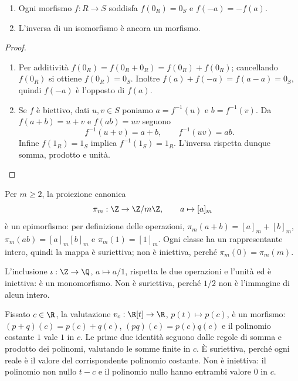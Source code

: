 \begin{proposizione}\label{prop:morfismi-zero}
\begin{enumerate}[label=\arabic*.]
\item Ogni morfismo $f:R\to S$ soddisfa $f(0_R)=0_S$ e $f(-a)=-f(a)$.
\item L'inversa di un isomorfismo è ancora un morfismo.
\end{enumerate}
\end{proposizione}
\begin{proof}
\begin{enumerate}[label=\arabic*.]
\item Per additività $f(0_R)=f(0_R+0_R)=f(0_R)+f(0_R)$; cancellando $f(0_R)$ si ottiene $f(0_R)=0_S$. Inoltre $f(a)+f(-a)=f(a-a)=0_S$, quindi $f(-a)$ è l'opposto di $f(a)$.
\item Se $f$ è biettivo, dati $u,v\in S$ poniamo $a=f^{-1}(u)$ e $b=f^{-1}(v)$. Da $f(a+b)=u+v$ e $f(ab)=uv$ seguono
\[
f^{-1}(u+v)=a+b,\qquad f^{-1}(uv)=ab.
\]
Infine $f(1_R)=1_S$ implica $f^{-1}(1_S)=1_R$. L'inversa rispetta dunque somma, prodotto e unità.
\end{enumerate}
\end{proof}

\begin{esempio}
Per $m\ge2$, la proiezione canonica
\[
\pi_m:\Z\to\Z/m\Z,\qquad a\mapsto[a]_m
\]
è un epimorfismo: per definizione delle operazioni, $\pi_m(a+b)=[a]_m+[b]_m$, $\pi_m(ab)=[a]_m[b]_m$ e $\pi_m(1)=[1]_m$. Ogni classe ha un rappresentante intero, quindi la mappa è suriettiva; non è iniettiva, perché $\pi_m(0)=\pi_m(m)$.

L'inclusione $\iota:\Z\to\Q$, $a\mapsto a/1$, rispetta le due operazioni e l'unità ed è iniettiva: è un monomorfismo. Non è suriettiva, perché $1/2$ non è l'immagine di alcun intero.
\end{esempio}

\begin{esempio}[Valutazione di polinomi]
Fissato $c\in\R$, la valutazione $v_c:\R[t]\to\R$, $p(t)\mapsto p(c)$, è un morfismo: $(p+q)(c)=p(c)+q(c)$, $(pq)(c)=p(c)q(c)$ e il polinomio costante $1$ vale $1$ in $c$. Le prime due identità seguono dalle regole di somma e prodotto dei polinomi, valutando le somme finite in $c$. È suriettiva, perché ogni reale è il valore del corrispondente polinomio costante. Non è iniettiva: il polinomio non nullo $t-c$ e il polinomio nullo hanno entrambi valore $0$ in $c$.
\end{esempio}

